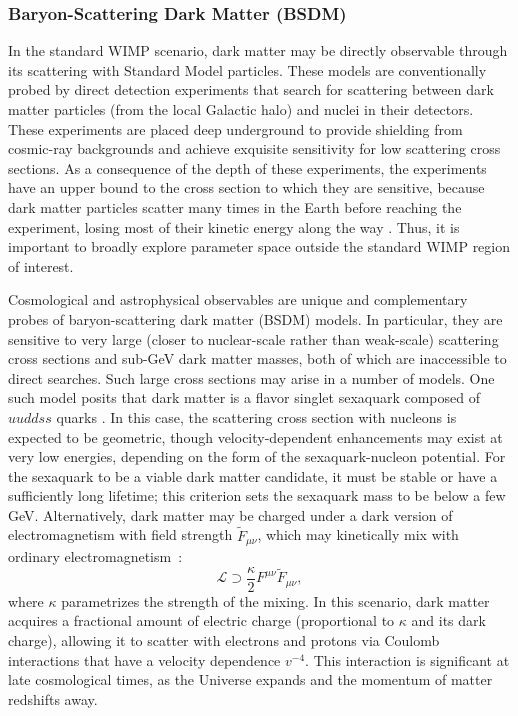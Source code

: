      
\subsubsection{Baryon-Scattering Dark Matter (BSDM) }
\label{sec:bsdm}

In the standard WIMP scenario, dark matter may be directly observable through its scattering with Standard Model particles.
These models are conventionally probed by direct detection experiments that search for scattering between dark matter particles (from the local Galactic halo) and nuclei in their detectors.
These experiments are placed deep underground to provide shielding from cosmic-ray backgrounds and achieve exquisite sensitivity for low scattering cross sections. As a consequence of the depth of these experiments, the experiments have an upper bound to the cross section to which they are sensitive, because dark matter particles scatter many times in the Earth before reaching the experiment, losing most of their kinetic energy along the way \citep{Zaharijas:2004jv}.
Thus, it is important to broadly explore parameter space outside the standard WIMP region of interest.

Cosmological and astrophysical observables are unique and complementary probes of baryon-scattering dark matter (BSDM) models.
In particular, they are sensitive to very large (closer to nuclear-scale rather than weak-scale) scattering cross sections and sub-GeV dark matter masses, both of which are inaccessible to direct searches.
Such large cross sections may arise in a number of models.
One such model posits that dark matter is a flavor singlet sexaquark composed of $uuddss$ quarks \citep{Farrar:2017eqq}.
In this case, the scattering cross section with nucleons is expected to be geometric, though velocity-dependent enhancements may exist at very low energies, depending on the form of the sexaquark-nucleon potential.
For the sexaquark to be a viable dark matter candidate, it must be stable or have a sufficiently long lifetime; this criterion sets the sexaquark mass to be below a few GeV.
Alternatively, dark matter may be charged under a dark version of electromagnetism with field strength $\tilde{F}_{\mu\nu}$, which may kinetically mix with ordinary electromagnetism~\citep{Holdom:1985ag}:
\begin{equation}
    \mathcal{L} \supset \frac{\kappa}{2} F^{\mu\nu} \tilde{F}_{\mu\nu} ,
\end{equation}
where $\kappa$ parametrizes the strength of the mixing.
In this scenario, dark matter acquires a fractional amount of electric charge (proportional to $\kappa$ and its dark charge), allowing it to scatter with electrons and protons via Coulomb interactions that have a velocity dependence $v^{-4}$.
This interaction is significant at late cosmological times, as the Universe expands and the momentum of matter redshifts away.

